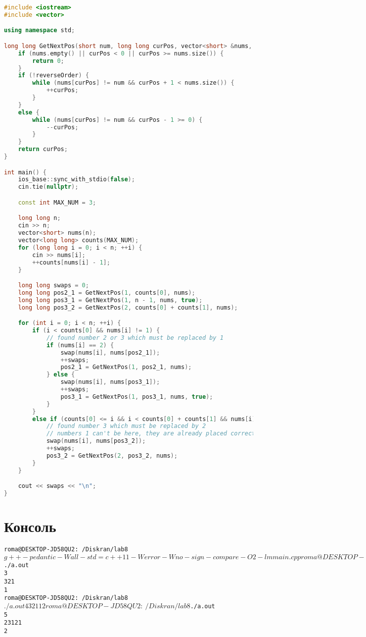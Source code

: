 \begin{lstlisting}[language=C++]
#include <iostream>
#include <vector>

using namespace std;

long long GetNextPos(short num, long long curPos, vector<short> &nums, bool reverseOrder = false) {
    if (nums.empty() || curPos < 0 || curPos >= nums.size()) {
        return 0;
    }
    if (!reverseOrder) {
        while (nums[curPos] != num && curPos + 1 < nums.size()) {
            ++curPos;
        }
    } 
    else {
        while (nums[curPos] != num && curPos - 1 >= 0) {
            --curPos;
        }
    }
    return curPos;
}

int main() {
    ios_base::sync_with_stdio(false);
    cin.tie(nullptr);

    const int MAX_NUM = 3;

    long long n;
    cin >> n;
    vector<short> nums(n);
    vector<long long> counts(MAX_NUM);
    for (long long i = 0; i < n; ++i) {
        cin >> nums[i];
        ++counts[nums[i] - 1];
    }

    long long swaps = 0;
    long long pos2_1 = GetNextPos(1, counts[0], nums);
    long long pos3_1 = GetNextPos(1, n - 1, nums, true);
    long long pos3_2 = GetNextPos(2, counts[0] + counts[1], nums);

    for (int i = 0; i < n; ++i) {
        if (i < counts[0] && nums[i] != 1) {
            // found number 2 or 3 which must be replaced by 1
            if (nums[i] == 2) {
                swap(nums[i], nums[pos2_1]);
                ++swaps;
                pos2_1 = GetNextPos(1, pos2_1, nums);
            } else {
                swap(nums[i], nums[pos3_1]);
                ++swaps;
                pos3_1 = GetNextPos(1, pos3_1, nums, true);
            }
        } 
        else if (counts[0] <= i && i < counts[0] + counts[1] && nums[i] != 2) {
            // found number 3 which must be replaced by 2
            // numbers 1 can't be here, they are already placed correctly
            swap(nums[i], nums[pos3_2]);
            ++swaps;
            pos3_2 = GetNextPos(2, pos3_2, nums);
        }
    }

    cout << swaps << "\n";
}
\end{lstlisting}
\pagebreak

\section{Консоль}
\begin{alltt}
roma@DESKTOP-JD58QU2:~/Diskran/lab8$ g++ -pedantic -Wall -std=c++11 -Werror
-Wno-sign-compare -O2 -lm main.cpp
roma@DESKTOP-JD58QU2:~/Diskran/lab8$ ./a.out
3
3 2 1
1
roma@DESKTOP-JD58QU2:~/Diskran/lab8$ ./a.out
4
3 2 1 1
2
roma@DESKTOP-JD58QU2:~/Diskran/lab8$ ./a.out
5
2 3 1 2 1
2
\end{alltt}
\pagebreak

